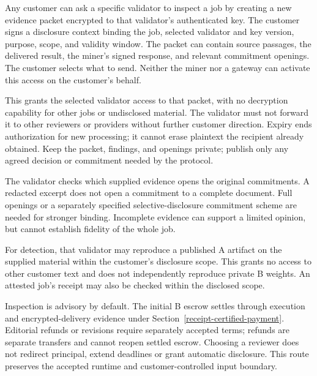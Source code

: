 Any customer can ask a specific validator to inspect a job by creating a
new evidence packet encrypted to that validator's authenticated key. The
customer signs a disclosure context binding the job, selected validator
and key version, purpose, scope, and validity window. The packet can
contain source passages, the delivered result, the miner's signed
response, and relevant commitment openings. The customer selects what to
send. Neither the miner nor a gateway can activate this access on the
customer's behalf.

This grants the selected validator access to that packet, with no
decryption capability for other jobs or undisclosed material. The
validator must not forward it to other reviewers or providers without
further customer direction. Expiry ends authorization for new
processing; it cannot erase plaintext the recipient already obtained.
Keep the packet, findings, and openings private; publish only any agreed
decision or commitment needed by the protocol.

The validator checks which supplied evidence opens the original
commitments. A redacted excerpt does not open a commitment to a complete
document. Full openings or a separately specified selective-disclosure
commitment scheme are needed for stronger binding. Incomplete evidence
can support a limited opinion, but cannot establish fidelity of the
whole job.

For detection, that validator may reproduce a published A artifact on
the supplied material within the customer's disclosure scope. This grants
no access to other customer text and does not independently reproduce private B weights. An attested
job's receipt may also be checked within the disclosed scope.

Inspection is advisory by default. The initial B escrow settles through
execution and encrypted-delivery evidence under
Section~\ref{receipt-certified-payment}. Editorial refunds or revisions
require separately accepted terms; refunds are separate transfers and
cannot reopen settled escrow. Choosing a reviewer does not redirect
principal, extend deadlines or grant automatic disclosure. This route
preserves the accepted runtime and customer-controlled input boundary.
